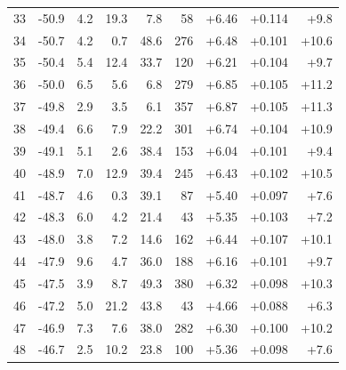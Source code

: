 \begin{longtable}{@{}r r r r r r r r r@{}}
33 & -50.9 & 4.2 & 19.3 & 7.8 & 58 & \cellcolor{green!66}+6.46 & \cellcolor{yellow!70}+0.114 & \cellcolor{orange!62}+9.8 \\
34 & -50.7 & 4.2 & 0.7 & 48.6 & 276 & \cellcolor{green!66}+6.48 & \cellcolor{yellow!63}+0.101 & \cellcolor{orange!66}+10.6 \\
35 & -50.4 & 5.4 & 12.4 & 33.7 & 120 & \cellcolor{green!64}+6.21 & \cellcolor{yellow!65}+0.104 & \cellcolor{orange!62}+9.7 \\
36 & -50.0 & 6.5 & 5.6 & 6.8 & 279 & \cellcolor{green!69}+6.85 & \cellcolor{yellow!66}+0.105 & \cellcolor{orange!69}+11.2 \\
37 & -49.8 & 2.9 & 3.5 & 6.1 & 357 & \cellcolor{green!69}+6.87 & \cellcolor{yellow!65}+0.105 & \cellcolor{orange!69}+11.3 \\
38 & -49.4 & 6.6 & 7.9 & 22.2 & 301 & \cellcolor{green!68}+6.74 & \cellcolor{yellow!65}+0.104 & \cellcolor{orange!68}+10.9 \\
39 & -49.1 & 5.1 & 2.6 & 38.4 & 153 & \cellcolor{green!63}+6.04 & \cellcolor{yellow!63}+0.101 & \cellcolor{orange!60}+9.4 \\
40 & -48.9 & 7.0 & 12.9 & 39.4 & 245 & \cellcolor{green!66}+6.43 & \cellcolor{yellow!64}+0.102 & \cellcolor{orange!66}+10.5 \\
41 & -48.7 & 4.6 & 0.3 & 39.1 & 87 & \cellcolor{green!58}+5.40 & \cellcolor{yellow!62}+0.097 & \cellcolor{orange!51}+7.6 \\
42 & -48.3 & 6.0 & 4.2 & 21.4 & 43 & \cellcolor{green!57}+5.35 & \cellcolor{yellow!64}+0.103 & \cellcolor{orange!50}+7.2 \\
43 & -48.0 & 3.8 & 7.2 & 14.6 & 162 & \cellcolor{green!66}+6.44 & \cellcolor{yellow!66}+0.107 & \cellcolor{orange!64}+10.1 \\
44 & -47.9 & 9.6 & 4.7 & 36.0 & 188 & \cellcolor{green!64}+6.16 & \cellcolor{yellow!63}+0.101 & \cellcolor{orange!62}+9.7 \\
45 & -47.5 & 3.9 & 8.7 & 49.3 & 380 & \cellcolor{green!65}+6.32 & \cellcolor{yellow!62}+0.098 & \cellcolor{orange!65}+10.3 \\
46 & -47.2 & 5.0 & 21.2 & 43.8 & 43 & \cellcolor{green!52}+4.66 & \cellcolor{yellow!57}+0.088 & \cellcolor{orange!46}+6.3 \\
47 & -46.9 & 7.3 & 7.6 & 38.0 & 282 & \cellcolor{green!65}+6.30 & \cellcolor{yellow!63}+0.100 & \cellcolor{orange!64}+10.2 \\
48 & -46.7 & 2.5 & 10.2 & 23.8 & 100 & \cellcolor{green!57}+5.36 & \cellcolor{yellow!62}+0.098 & \cellcolor{orange!51}+7.6 \\

\end{longtable}

